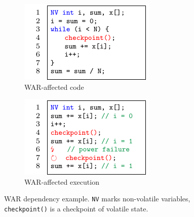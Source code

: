 \begin{figure}		
	\centering
	\begin{minipage}{.8\textwidth}
	\begin{subfigure}{.5\columnwidth}
			\includegraphics[width=\columnwidth, trim={.3cm 0 0 0}]{figures/war-example.pdf}
		\caption{WAR-affected code}
		\label{fig:war-example}
	\end{subfigure}
	\begin{subfigure}{.5\columnwidth}
			\includegraphics[width=\columnwidth,trim={.3cm 0 0 0 }  ]{figures/war-execution.pdf}
		\caption{WAR-affected execution}
		\label{fig:war-execution}
	\end{subfigure}
	\caption{WAR dependency example. \texttt{NV} marks non-volatile variables, \texttt{checkpoint()} is a checkpoint of volatile state.	\label{fig:w-a-r}}
	\end{minipage}
\end{figure}


